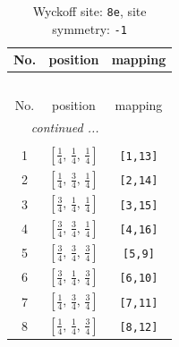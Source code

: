 \documentclass[fleqn,8pt]{jsarticle}
\begin{document}
\renewcommand{\arraystretch}{1.2}
\begin{longtable}{ccc}
\caption{Wyckoff site: {\tt 8e}, site symmetry: {\tt -1}}
 \\
 \hline \hline
No. & position & mapping \\ \hline \endfirsthead

\multicolumn{2}{l}{\tablename\ \thetable{}} \\
 \hline \hline
No. & position & mapping \\ \hline \endhead

 \hline \hline
\multicolumn{2}{r}{\footnotesize\it continued ...} \\ \endfoot

 \hline \hline
\multicolumn{2}{r}{} \\ \endlastfoot

1 & $\left[ \frac{1}{4},\, \frac{1}{4},\, \frac{1}{4} \right]$ & {\tt [1,13]} \\ \hline
2 & $\left[ \frac{1}{4},\, \frac{3}{4},\, \frac{1}{4} \right]$ & {\tt [2,14]} \\ \hline
3 & $\left[ \frac{3}{4},\, \frac{1}{4},\, \frac{1}{4} \right]$ & {\tt [3,15]} \\ \hline
4 & $\left[ \frac{3}{4},\, \frac{3}{4},\, \frac{1}{4} \right]$ & {\tt [4,16]} \\ \hline
5 & $\left[ \frac{3}{4},\, \frac{3}{4},\, \frac{3}{4} \right]$ & {\tt [5,9]} \\ \hline
6 & $\left[ \frac{3}{4},\, \frac{1}{4},\, \frac{3}{4} \right]$ & {\tt [6,10]} \\ \hline
7 & $\left[ \frac{1}{4},\, \frac{3}{4},\, \frac{3}{4} \right]$ & {\tt [7,11]} \\ \hline
8 & $\left[ \frac{1}{4},\, \frac{1}{4},\, \frac{3}{4} \right]$ & {\tt [8,12]} \\
\end{longtable}
\renewcommand{\arraystretch}{1.2}
\end{document}
